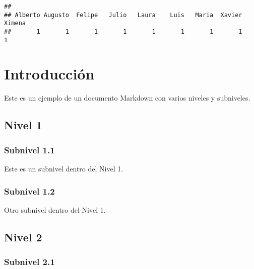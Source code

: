 \documentclass[
]{book}
\newenvironment{Shaded}{\begin{snugshade}}{\end{snugshade}}
\newcommand{\FunctionTok}[1]{\textcolor[rgb]{0.13,0.29,0.53}{\textbf{#1}}}
\newcommand{\NormalTok}[1]{#1}
\newcommand{\SpecialCharTok}[1]{\textcolor[rgb]{0.81,0.36,0.00}{\textbf{#1}}}
\theoremstyle{definition}
\theoremstyle{definition}
\theoremstyle{definition}
\theoremstyle{definition}
\theoremstyle{remark}
\begin{document}
\begin{Shaded}
\end{Shaded}

\begin{verbatim}
## 
## Alberto Augusto  Felipe   Julio   Laura    Luis   Maria  Xavier  Ximena 
##       1       1       1       1       1       1       1       1       1
\end{verbatim}

\hypertarget{introducciuxf3n}{%
\chapter*{Introducción}\label{introducciuxf3n}}

Este es un ejemplo de un documento Markdown con varios niveles y subniveles.

\hypertarget{nivel-1}{%
\section*{Nivel 1}\label{nivel-1}}

\hypertarget{subnivel-1.1}{%
\subsection*{Subnivel 1.1}\label{subnivel-1.1}}

Este es un subnivel dentro del Nivel 1.

\hypertarget{subnivel-1.2}{%
\subsection*{Subnivel 1.2}\label{subnivel-1.2}}

Otro subnivel dentro del Nivel 1.

\hypertarget{nivel-2}{%
\section*{Nivel 2}\label{nivel-2}}

\hypertarget{subnivel-2.1}{%
\subsection*{Subnivel 2.1}\label{subnivel-2.1}}
\end{document}
